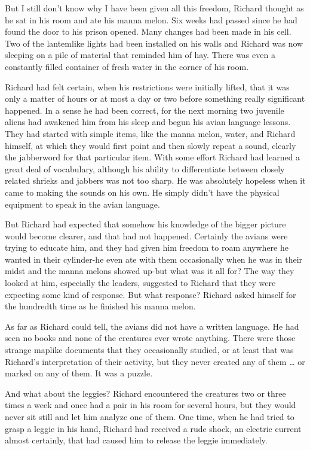 \documentclass[]{article}
\begin{document}
{But I still don’t know why I have been given all this freedom, Richard thought as he sat in his room and ate his manna melon.  Six weeks had passed since he had found the door to his prison opened.  Many changes had been made in his cell.  Two of the lantemlike lights had been installed on his walls and Richard was now sleeping on a pile of material that reminded him of hay.  There was even a constantly filled container of fresh water in the corner of his room.

Richard had felt certain, when his restrictions were initially lifted, that it was only a matter of hours or at most a day or two before something really significant happened.  In a sense he had been correct, for the next morning two juvenile aliens had awakened him from his sleep and begun his avian language lessons.  They had started with simple items, like the manna melon, water, and Richard himself, at which they would first point and then slowly repeat a sound, clearly the jabberword for that particular item.  With some effort Richard had learned a great deal of vocabulary, although his ability to differentiate between closely related shrieks and jabbers was not too sharp.  He was absolutely hopeless when it came to making the sounds on his own.  He simply didn’t have the physical equipment to speak in the avian language.

But Richard had expected that somehow his knowledge of the bigger picture would become clearer, and that had not happened.  Certainly the avians were trying to educate him, and they had given him freedom to roam anywhere he wanted in their cylinder-he even ate with them occasionally when he was in their midst and the manna melons showed up-but what was it all for? The way they looked at him, especially the leaders, suggested to Richard that they were expecting some kind of response.  But what response? Richard asked himself for the hundredth time as he finished his manna melon.

As far as Richard could tell, the avians did not have a written language.  He had seen no books and none of the creatures ever wrote anything.  There were those strange maplike documents that they occasionally studied, or at least that was Richard’s interpretation of their activity, but they never created any of them … or marked on any of them.  It was a puzzle.

And what about the leggies? Richard encountered the creatures two or three times a week and once had a pair in his room for several hours, but they would never sit still and let him analyze one of them.  One time, when he had tried to grasp a leggie in his hand, Richard had received a rude shock, an electric current almost certainly, that had caused him to release the leggie immediately.

}
\end{document}
